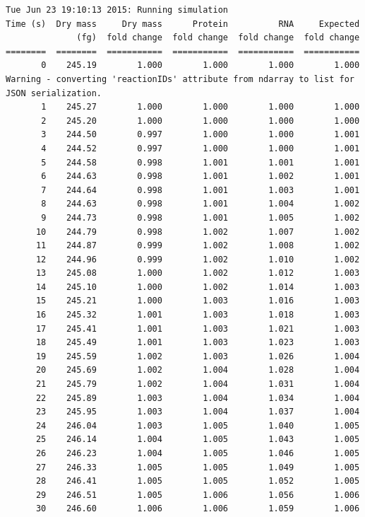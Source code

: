 \documentclass[12pt]{article}
\begin{document}
\begin{lstlisting}
Tue Jun 23 19:10:13 2015: Running simulation
Time (s)  Dry mass     Dry mass      Protein          RNA     Expected
              (fg)  fold change  fold change  fold change  fold change
========  ========  ===========  ===========  ===========  ===========
       0    245.19        1.000        1.000        1.000        1.000
Warning - converting 'reactionIDs' attribute from ndarray to list for JSON serialization.
       1    245.27        1.000        1.000        1.000        1.000
       2    245.20        1.000        1.000        1.000        1.000
       3    244.50        0.997        1.000        1.000        1.001
       4    244.52        0.997        1.000        1.000        1.001
       5    244.58        0.998        1.001        1.001        1.001
       6    244.63        0.998        1.001        1.002        1.001
       7    244.64        0.998        1.001        1.003        1.001
       8    244.63        0.998        1.001        1.004        1.002
       9    244.73        0.998        1.001        1.005        1.002
      10    244.79        0.998        1.002        1.007        1.002
      11    244.87        0.999        1.002        1.008        1.002
      12    244.96        0.999        1.002        1.010        1.002
      13    245.08        1.000        1.002        1.012        1.003
      14    245.10        1.000        1.002        1.014        1.003
      15    245.21        1.000        1.003        1.016        1.003
      16    245.32        1.001        1.003        1.018        1.003
      17    245.41        1.001        1.003        1.021        1.003
      18    245.49        1.001        1.003        1.023        1.003
      19    245.59        1.002        1.003        1.026        1.004
      20    245.69        1.002        1.004        1.028        1.004
      21    245.79        1.002        1.004        1.031        1.004
      22    245.89        1.003        1.004        1.034        1.004
      23    245.95        1.003        1.004        1.037        1.004
      24    246.04        1.003        1.005        1.040        1.005
      25    246.14        1.004        1.005        1.043        1.005
      26    246.23        1.004        1.005        1.046        1.005
      27    246.33        1.005        1.005        1.049        1.005
      28    246.41        1.005        1.005        1.052        1.005
      29    246.51        1.005        1.006        1.056        1.006
      30    246.60        1.006        1.006        1.059        1.006

\end{lstlisting}
\end{document}
